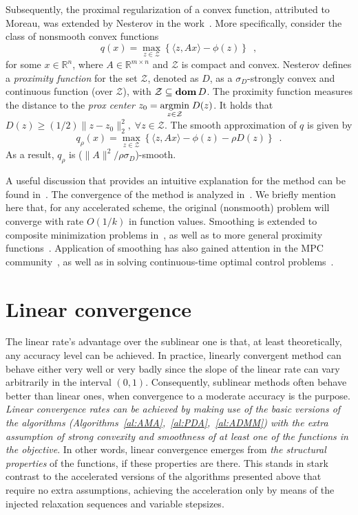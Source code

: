 \documentclass[openany]{now}
\newcommand{\reals}{{\mathbb R}}
\newcommand{\dom}{\mathop{\bf dom}}
\newcommand{\argmin}{\mathop{\rm argmin}}
\begin{document}
Subsequently, the proximal regularization of a convex function, attributed to Moreau, was extended by Nesterov in the work~\cite{Nesterov:smoothing}. More specifically, consider the class of nonsmooth convex functions 
\[
 q(x) = \underset{z\in\mathcal{Z}}{\max}\left\{\langle z,Ax\rangle-\phi(z)\right\}\enspace,
\]
for some $x\in\reals^n$, where $A\in\reals^{m\times n}$ and $\mathcal{Z}$ is compact and convex. Nesterov defines a \emph{proximity function} for the set $\mathcal{Z}$, denoted as $D$, as a $\sigma_D$-strongly convex and continuous function (over $\mathcal{Z}$), with $\mathcal{Z} \subseteq\dom D$. The proximity function measures the distance to the \emph{prox center} $z_0=\underset{z\in\mathcal{Z}}{\argmin}\;D(z)$. It holds that $D(z)\geq (1/2)\|z-z_0\|_2^2, \; \forall z\in\mathcal{Z}$. The smooth approximation of $q$ is given by
\[
 q_\rho(x) = \underset{z\in\mathcal{Z}}{\max}\left\{\langle z,Ax\rangle-\phi(z)-\rho D(z)\right\}\enspace.
\]
As a result, $q_\rho$ is ($\|A\|^2/\rho\sigma_D$)-smooth.

A useful discussion that provides an intuitive explanation for the method can be found in~\cite{nesterov2008advance}. The convergence of the method is analyzed in~\cite{Nesterov:smoothing}. We briefly mention here that, for any accelerated scheme, the original (nonsmooth) problem will converge with rate $O(1/k)$ in function values. Smoothing is extended to composite minimization problems in~\cite{nesterov2007gradient}, as well as to more general proximity functions~\cite{beck2012smoothing}. Application of smoothing has also gained attention in the MPC community~\cite{necoara2008application}, as well as in solving continuous-time optimal control problems~\cite{devolder2012double}.

\section{Linear convergence}{\label{ch:acceleration::linear}}
The linear rate's advantage over the sublinear one is that, at least theoretically, any accuracy level can be achieved. In practice, linearly convergent method can behave either very well or very badly since the slope of the linear rate can vary arbitrarily in the interval $(0,1)$. Consequently, sublinear methods often behave better than linear ones, when convergence to a moderate accuracy is the purpose. \emph{Linear convergence rates can be achieved by making use of the basic versions of the algorithms (Algorithms~\ref{al:AMA},~\ref{al:PDA},~\ref{al:ADMM}) with the extra assumption of strong convexity and smoothness of at least one of the functions in the objective}. In other words, linear convergence emerges from \emph{the structural properties} of the functions, if these properties are there. This stands in stark contrast to the accelerated versions of the algorithms presented above that require no extra assumptions, achieving the acceleration only by means of the injected relaxation sequences and variable stepsizes. 
\end{document}
